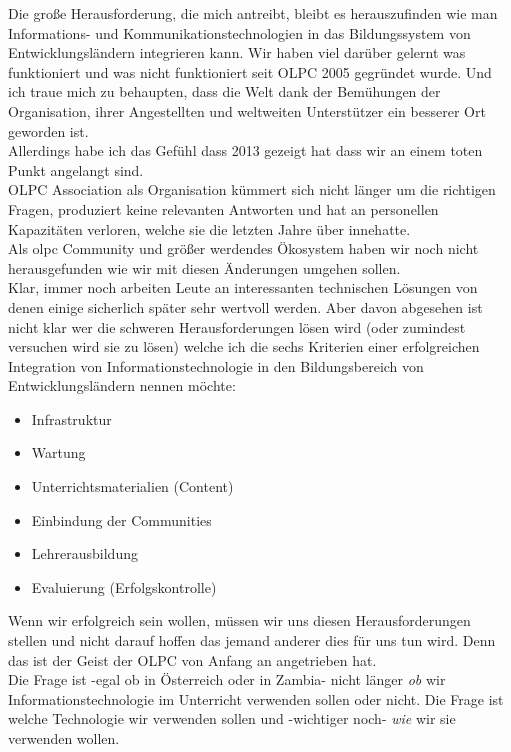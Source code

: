 Die große Herausforderung, die mich antreibt, bleibt es herauszufinden wie man Informations- und Kommunikationstechnologien in das Bildungssystem von Entwicklungsländern integrieren kann. Wir haben viel darüber gelernt was funktioniert und was nicht funktioniert seit OLPC 2005 gegründet wurde. Und ich traue mich zu behaupten, dass die Welt dank der Bemühungen der Organisation, ihrer Angestellten und weltweiten Unterstützer ein besserer Ort geworden ist. \\

Allerdings habe ich das Gefühl dass 2013 gezeigt hat dass wir an einem toten Punkt angelangt sind. \\

OLPC Association als Organisation kümmert sich nicht länger um die richtigen Fragen, produziert keine relevanten Antworten und hat an personellen Kapazitäten verloren, welche sie die letzten Jahre über innehatte. \\

Als olpc Community und größer werdendes Ökosystem haben wir noch nicht herausgefunden wie wir mit diesen Änderungen umgehen sollen. \\

Klar, immer noch arbeiten Leute an interessanten technischen Lösungen von denen einige sicherlich später sehr wertvoll werden. Aber davon abgesehen ist nicht klar wer die schweren Herausforderungen lösen wird (oder zumindest versuchen wird sie zu lösen) welche ich die sechs Kriterien einer erfolgreichen Integration von Informationstechnologie in den Bildungsbereich von Entwicklungsländern nennen möchte:

\begin{itemize}
\item Infrastruktur
\item Wartung
\item Unterrichtsmaterialien (Content)
\item Einbindung der Communities
\item Lehrerausbildung
\item Evaluierung (Erfolgskontrolle)
\end{itemize}

Wenn wir erfolgreich sein wollen, müssen wir uns diesen Herausforderungen stellen und nicht darauf hoffen das jemand anderer dies für uns tun wird. Denn das ist der Geist der OLPC von Anfang an angetrieben hat. \\

Die Frage ist -egal ob in Österreich oder in Zambia- nicht länger \textit{ob} wir Informationstechnologie im Unterricht verwenden sollen oder nicht. Die Frage ist welche Technologie wir verwenden sollen und -wichtiger noch- \textit{wie} wir sie verwenden wollen. \\

